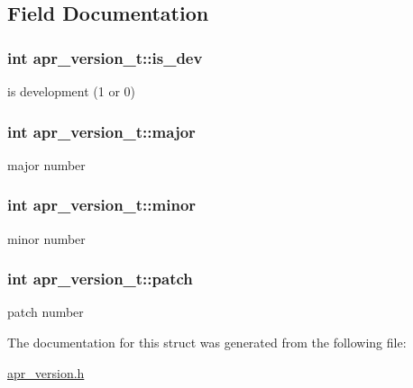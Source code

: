 \subsection{Field Documentation}
\hypertarget{structapr__version__t_aadc878af1010faa53e365e1142c81ced}{
\subsubsection[{is\-\_\-dev}]{\setlength{\rightskip}{0pt plus 5cm}int apr\-\_\-version\-\_\-t\-::is\-\_\-dev}}\label{structapr__version__t_aadc878af1010faa53e365e1142c81ced}
is development (1 or 0) \hypertarget{structapr__version__t_a0ae64fee85387834ab76d9f9288373ab}{
\subsubsection[{major}]{\setlength{\rightskip}{0pt plus 5cm}int apr\-\_\-version\-\_\-t\-::major}}\label{structapr__version__t_a0ae64fee85387834ab76d9f9288373ab}
major number \hypertarget{structapr__version__t_aab0a1e8362517416389631bceeeedbad}{
\subsubsection[{minor}]{\setlength{\rightskip}{0pt plus 5cm}int apr\-\_\-version\-\_\-t\-::minor}}\label{structapr__version__t_aab0a1e8362517416389631bceeeedbad}
minor number \hypertarget{structapr__version__t_a98a629a88e776642d6e527d7535e0791}{
\subsubsection[{patch}]{\setlength{\rightskip}{0pt plus 5cm}int apr\-\_\-version\-\_\-t\-::patch}}\label{structapr__version__t_a98a629a88e776642d6e527d7535e0791}
patch number 

The documentation for this struct was generated from the following file\-:\begin{DoxyCompactItemize}
\item 
\hyperlink{apr__version_8h}{apr\-\_\-version.\-h}\end{DoxyCompactItemize}
